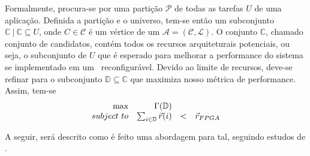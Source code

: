       Formalmente, procura-se por uma partição $ \mathcal{P} $ de todas as tarefas $ U $ de uma aplicação.
      Definida a partição e o universo, tem-se então um subconjunto $ \mathbb{C}\ |\ \mathbb{C} \subseteq U $, onde $ C \in \mathcal{C} $ é um vértice de um $ \mathcal{A} = (\mathcal{C}, \mathcal{L}) $.
      O conjunto $ \mathbb{C} $, chamado conjunto de candidatos, contém todos os recursos arquiteturais potenciais, ou seja, o subconjunto de $ U $ que é esperado para melhorar a performance do sistema se implementado em um \hardware\ reconfigurável.
      Devido ao limite de recursos, deve-se refinar para o subconjunto $ \mathbb{D} \subseteq \mathbb{C} $ que maximiza nosso métrica de performance.
      Assim, tem-se
      \begin{equation}
         \begin{array}{rrcl}
         \textnormal{max}                 & \Gamma ( \mathbb{D})               & ~   & ~                \\
         subject\ to & \sum_{i \in \mathbb{D}} \vec{r}(i) & < & \vec{r}_{FPGA}
         \end{array}
         \label{eq:constraints}
      \end{equation}

      A seguir, será descrito como é feito uma abordagem para tal, seguindo estudos de \cite{Arato2003, Wang2016}.



